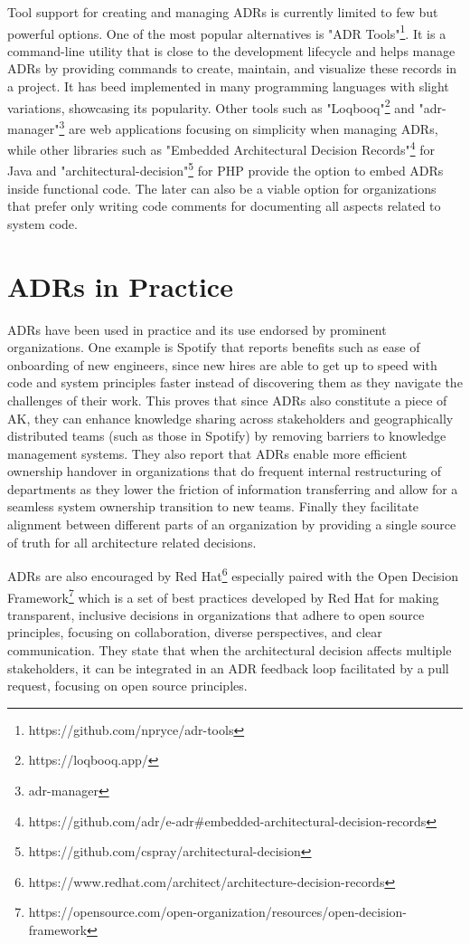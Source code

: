         Tool support for creating and managing ADRs is currently limited to few but powerful options. One of the most popular alternatives is "ADR Tools"\footnote{https://github.com/npryce/adr-tools}. It is a command-line utility that is close to the development lifecycle and helps manage ADRs by providing commands to create, maintain, and visualize these records in a project. It has beed implemented in many programming languages with slight variations, showcasing its popularity. Other tools such as "Loqbooq"\footnote{https://loqbooq.app/} and "adr-manager"\footnote{adr-manager} are web applications focusing on simplicity when managing ADRs, while other libraries such as "Embedded Architectural Decision Records"\footnote{https://github.com/adr/e-adr\#embedded-architectural-decision-records} for Java and "architectural-decision"\footnote{https://github.com/cspray/architectural-decision} for PHP provide the option to embed ADRs inside functional code. The later can also be a viable option for organizations that prefer only writing code comments for documenting all aspects related to system code.

    \newpage
    \section{ADRs in Practice}
        ADRs have been used in practice and its use endorsed by prominent organizations. One example is Spotify\cite{Spotify_ADRS} that reports benefits such as ease of onboarding of new engineers, since new hires are able to get up to speed with code and system principles faster instead of discovering them as they navigate the challenges of their work. This proves that since ADRs also constitute a piece of AK, they can enhance knowledge sharing across stakeholders and geographically distributed teams (such as those in Spotify) \cite{AK_management} by removing barriers to knowledge management systems. They also report that ADRs enable more efficient ownership handover in organizations that do frequent internal restructuring of departments as they lower the friction of information transferring and allow for a seamless system ownership transition to new teams. Finally they facilitate alignment between different parts of an organization by providing a single source of truth for all architecture related decisions.

        ADRs are also encouraged by Red Hat\footnote{https://www.redhat.com/architect/architecture-decision-records} especially paired with the Open Decision Framework\footnote{https://opensource.com/open-organization/resources/open-decision-framework} which is a set of best practices developed by Red Hat for making transparent, inclusive decisions in organizations that adhere to open source principles, focusing on collaboration, diverse perspectives, and clear communication. They state that when the architectural decision affects multiple stakeholders, it can be integrated in an ADR feedback loop facilitated by a pull request, focusing on open source principles.  

